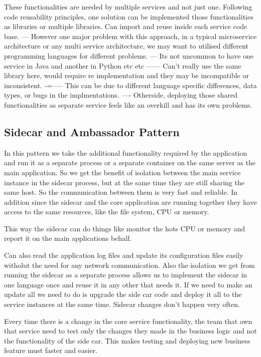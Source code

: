 \documentclass[a4paper, 11pt]{book}
\begin{document}
    These functionalities are needed by multiple services and not just one.
    Following code reusability principles, one solution can be implemented those functionalities as libraries or multiple libraries.
    Can import and reuse inside each service code base.
    --- However one major problem with this approach, in a typical microservice architecture or any multi service architecture, we may want to utilised different programming languages for different problems.
    --- Its not uncommon to have one service in Java and another in Python etc etc
    ------ Can't really use the same library here, would require re implementation and they may be incompatible or inconsistent.
    -=----- This can be due to different language specific differences, data types, or bugs in the implmentations.
    ---- Otherside, deploying those shared functionalities as separate service feels like an overkill and has its own problems.

    \subsection{Sidecar and Ambassador Pattern}
    In this pattern we take the additional functionality required by the application and run it as a separate process or a separate container on the same server as the main application.
    So we get the benefit of isolation between the main service instance in the sidecar process, but at the same time they are still sharing the same host.
    So the communication between them is very fast and reliable.
    In addition since the sidecar and the core application are running together they have access to the same resources, like the file system, CPU or memory.

    This way the sidecar can do things like monitor the hots CPU or memory and report it on the main applications behalf.

    Can also read the application log files and update its configuration files easily witholut the need for any network communication.
    Also the isolation we get from running the sidecar as a separate process allows us to implement the sidecar in one language once and reuse it in any other that needs it.
    If we need to make an update all we need to do is upgrade the side car code and deploy it all to the service instances at the same time.
    Sidecar changes don't happen very often.

    Every time there is a change in the core service functionality, the team that own that service need to test only the changes they made in the business logic and not the functionality of the side car.
    This makes testing and deploying new business feature must faster and easier.
\end{document}
